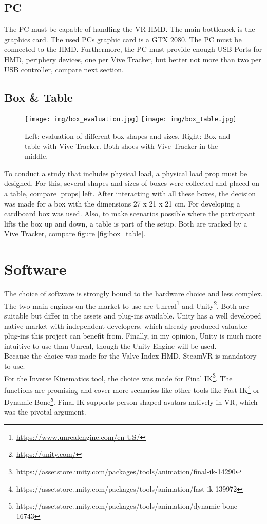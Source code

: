\subsection{PC}
The PC must be capable of handling the VR HMD. The main bottleneck is the graphics card. The used PCs graphic card is a GTX 2080. The PC must be connected to the HMD. Furthermore, the PC must provide enough USB Ports for HMD, periphery devices, one per Vive Tracker, but better not more than two per USB controller, compare next section.

\subsection{Box \& Table}
\begin{figure}
	\centering
	\texttt{[image: img/box\_evaluation.jpg]}
	\texttt{[image: img/box\_table.jpg]}
	\caption{Left: evaluation of different box shapes and sizes. Right: Box and table with Vive Tracker. Both shoes with Vive Tracker in the middle.}
	\label{fig:props}
\end{figure}

To conduct a study that includes physical load, a physical load prop must be designed. For this, several shapes and sizes of boxes were collected and placed on a table, compare \ref{props} left. After interacting with all these boxes, the decision was made for a box with the dimensions 27 x 21 x 21 cm. For developing a cardboard box was used. Also, to make scenarios possible where the participant lifts the box up and down, a table is part of the setup. Both are tracked by a Vive Tracker, compare figure \ref{fig:box_table}.

\section{Software}
The choice of software is strongly bound to the hardware choice and less complex. The two main engines on the market to use are Unreal\footnote{\href{https://www.unrealengine.com/en-US/}{https://www.unrealengine.com/en-US/}} and Unity\footnote{\href{https://unity.com/}{https://unity.com/}}. Both are suitable but differ in the assets and plug-ins available. Unity has a well developed native market with independent developers, which already produced valuable plug-ins this project can benefit from. Finally, in my opinion, Unity is much more intuitive to use than Unreal, though the Unity Engine will be used.\\
Because the choice was made for the Valve Index HMD, SteamVR is mandatory to use.\\
For the Inverse Kinematics tool, the choice was made for Final IK\footnote{\href{https://assetstore.unity.com/packages/tools/animation/final-ik-14290}{https://assetstore.unity.com/packages/tools/animation/final-ik-14290}}. The functions are promising and cover more scenarios like other tools like Fast IK\footnote{https://assetstore.unity.com/packages/tools/animation/fast-ik-139972} or Dynamic Bone\footnote{https://assetstore.unity.com/packages/tools/animation/dynamic-bone-16743}. Final IK supports person-shaped avatars natively in VR, which was the pivotal argument.

